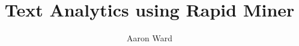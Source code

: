 \documentclass[12pt,ITBthesis]{report}
\begin{document}
\makeatletter
\renewcommand\listoffigures{%
        \@starttoc{lot}%
}
\makeatother

\makeatletter
\renewcommand\listoftables{%
        \@starttoc{lot}%
}
\makeatother

\makeatletter
\renewcommand\appendix{%
 \par
 \setcounter{chapter}{0}%
 \setcounter{section}{0}%
 \setcounter{subsection}{0}%
 \gdef\thesection{\@Alph\c@section}
 \gdef\@sect##1##2##3##4##5##6[##7]##8{%
  \refstepcounter{##1}%
  \protected@edef\@svsec{\@seccntformat{##1}\relax}%
  \begingroup
    \hspace{-\parindent}##6\appendixname~ {%
    \@hangfrom{\hskip ##3 \relax\@svsec}\par%
    \hspace{-\parindent}\interlinepenalty \@M ##8 \@@par}%
  \endgroup
  \csname ##1mark\endcsname{##7}%
  \addcontentsline{toc}{##1}{\protect\numberline{\csname the##1\endcsname}##7}%
  \@xsect{##5}%
 }%
}%
\makeatother

\setlength{\parskip}{1ex plus 0.5ex minus 0.2ex}


\title{Text Analytics using Rapid Miner}

\author{Aaron Ward}



\address{Dublin, Ireland }






%

\setcounter{page}{1} \beforepreface



{ 
}

%



\afterpreface
\def\baselinestretch{1}
\end{document}
